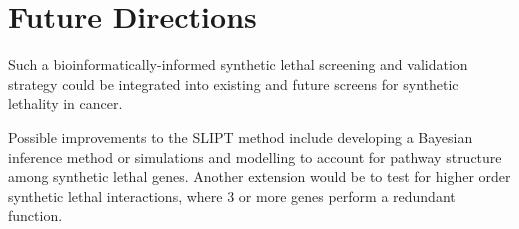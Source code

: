 \iffalse
\section{Evaluating the Synthetic Lethality Prediction Tool}
\label{chapt6:slipt}


\subsection{Strength of the Synthetic Lethality Prediction Tool}
\label{chapt6:slipt_strengths}

\subsection{Limitations of the Synthetic Lethality Prediction Tool}
\label{chapt6:slipt_limitations}

\subsection{Comparisons to Alternative Methods}
\label{chapt6:slipt_compare}

\subsubsection{Combined with Experimental Screening}
\label{chapt6:slipt_compare_experimental}

\subsubsection{Differences to Computational Methods}
\label{chapt6:slipt_compare_computational}
\fi

\section{Future Directions}
\label{chapt6:future}

\iffalse
Such a bioinformatically-informed synthetic lethal screening and validation strategy could be integrated into existing and future screens for synthetic lethality in cancer. 

Possible improvements to the SLIPT method include developing a Bayesian inference method or simulations and modelling to account for pathway structure among synthetic lethal genes. Another extension would be to test for higher order synthetic lethal interactions, where 3 or more genes perform a redundant function. 

